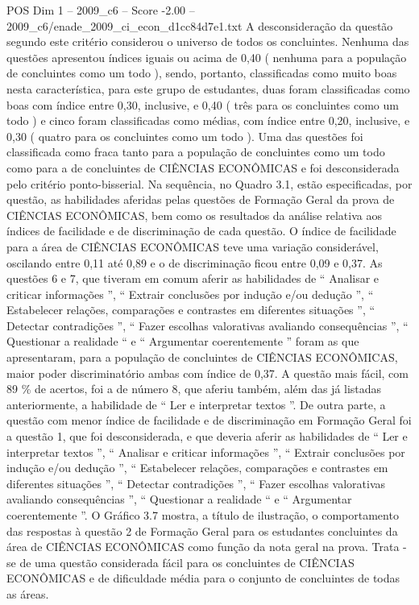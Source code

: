 \begin{textsample}{POS Dim 1 – 2009\_c6 – Score -2.00 – 2009\_c6/enade\_2009\_ci\_econ\_d1cc84d7e1.txt}
A desconsideração da questão segundo este critério considerou o universo de todos os concluintes.
Nenhuma das questões apresentou índices iguais ou acima de 0,40 ( nenhuma para a população de concluintes como um todo ), sendo, portanto, classificadas como muito boas nesta característica, para este grupo de estudantes, duas foram classificadas como boas com índice entre 0,30, inclusive, e 0,40 ( três para os concluintes como um todo ) e cinco foram classificadas como médias, com índice entre 0,20, inclusive, e 0,30 ( quatro para os concluintes como um todo ).
Uma das questões foi classificada como fraca tanto para a população de concluintes como um todo como para a de concluintes de CIÊNCIAS ECONÔMICAS e foi desconsiderada pelo critério ponto-bisserial.
Na sequência, no Quadro 3.1, estão especificadas, por questão, as habilidades aferidas pelas questões de Formação Geral da prova de CIÊNCIAS ECONÔMICAS, bem como os resultados da análise relativa aos índices de facilidade e de discriminação de cada questão.
O índice de facilidade para a área de CIÊNCIAS ECONÔMICAS teve uma variação considerável, oscilando entre 0,11 até 0,89 e o de discriminação ficou entre 0,09 e 0,37.
As questões 6 e 7, que tiveram em comum aferir as habilidades de “ Analisar e criticar informações ”, “ Extrair conclusões por indução e/ou dedução ”, “ Estabelecer relações, comparações e contrastes em diferentes situações ”, “ Detectar contradições ”, “ Fazer escolhas valorativas avaliando consequências ”, “ Questionar a realidade “ e “ Argumentar coerentemente ” foram as que apresentaram, para a população de concluintes de CIÊNCIAS ECONÔMICAS, maior poder discriminatório ambas com índice de 0,37.
A questão mais fácil, com 89 \% de acertos, foi a de número 8, que aferiu também, além das já listadas anteriormente, a habilidade de “ Ler e interpretar textos ”.
De outra parte, a questão com menor índice de facilidade e de discriminação em Formação Geral foi a questão 1, que foi desconsiderada, e que deveria aferir as habilidades de “ Ler e interpretar textos ”, “ Analisar e criticar informações ”, “ Extrair conclusões por indução e/ou dedução ”, “ Estabelecer relações, comparações e contrastes em diferentes situações ”, “ Detectar contradições ”, “ Fazer escolhas valorativas avaliando consequências ”, “ Questionar a realidade “ e “ Argumentar coerentemente ”.
O Gráfico 3.7 mostra, a título de ilustração, o comportamento das respostas à questão 2 de Formação Geral para os estudantes concluintes da área de CIÊNCIAS ECONÔMICAS como função da nota geral na prova.
Trata -se de uma questão considerada fácil para os concluintes de CIÊNCIAS ECONÔMICAS e de dificuldade média para o conjunto de concluintes de todas as áreas.

\end{textsample}
